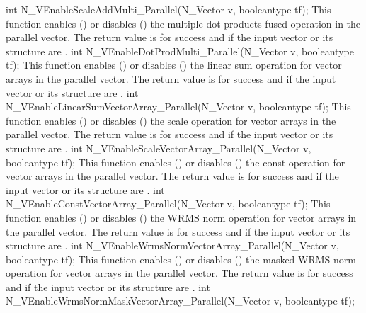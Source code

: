 {
  int N\_VEnableScaleAddMulti\_Parallel(N\_Vector v, booleantype tf);
}
{
  This function enables () or disables () the multiple
  dot products fused operation in the parallel vector. The return value is 
  for success and  if the input vector or its  structure are
  .
}
{
  int N\_VEnableDotProdMulti\_Parallel(N\_Vector v, booleantype tf);
}
{
  This function enables () or disables () the linear sum
  operation for vector arrays in the parallel vector. The return value is  for
  success and  if the input vector or its  structure are .
}
{
  int N\_VEnableLinearSumVectorArray\_Parallel(N\_Vector v, booleantype tf);
}
{
  This function enables () or disables () the scale
  operation for vector arrays in the parallel vector. The return value is  for
  success and  if the input vector or its  structure are .
}
{
  int N\_VEnableScaleVectorArray\_Parallel(N\_Vector v, booleantype tf);
}
{
  This function enables () or disables () the const
  operation for vector arrays in the parallel vector. The return value is  for
  success and  if the input vector or its  structure are .
}
{
  int N\_VEnableConstVectorArray\_Parallel(N\_Vector v, booleantype tf);
}
{
  This function enables () or disables () the WRMS norm
  operation for vector arrays in the parallel vector. The return value is  for
  success and  if the input vector or its  structure are .
}
{
  int N\_VEnableWrmsNormVectorArray\_Parallel(N\_Vector v, booleantype tf);
}
{
  This function enables () or disables () the masked WRMS
  norm operation for vector arrays in the parallel vector. The return value is
   for success and  if the input vector or its  structure are
  .
}
{
  int N\_VEnableWrmsNormMaskVectorArray\_Parallel(N\_Vector v, booleantype tf);
}
